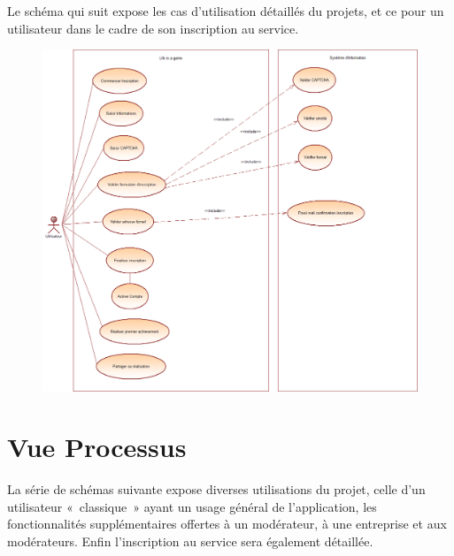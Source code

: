 \documentclass{life-fr}
\begin{document}
Le schéma qui suit expose les cas d'utilisation détaillés du projets, et ce pour un utilisateur dans le cadre de son inscription au service.

\begin{figure}[H]
  \begin{center}
    \includegraphics[width=17cm]{img/use_case_detailles.png}
  \end{center}
\end{figure}


\chapter{Vue Processus}

La série de schémas suivante expose diverses utilisations du projet, celle d'un utilisateur «~classique~» ayant un usage général de l'application, les fonctionnalités supplémentaires offertes à un modérateur, à une entreprise et aux modérateurs. Enfin l'inscription au service sera également détaillée.

\newpage
\end{document}
